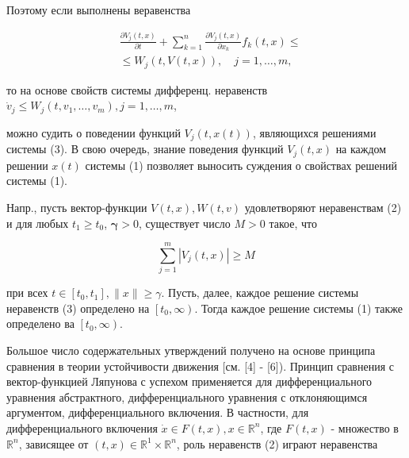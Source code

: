 \documentclass[10pt]{article}
\begin{document}
Поэтому если выполнены веравенства



\[

\begin{aligned}

& \frac{\partial V_{j}(t, x)}{\partial t}+\sum_{k=1}^{n} \frac{\partial V_{j}(t, x)}{\partial x_{k}} f_{k}(t, x) \leqslant \\

& \leqslant W_{j}(t, V(t, x)), \quad j=1, \ldots, m,

\end{aligned}

\]



то на основе свойств системы дифференц. неравенств $\dot{v}_{j} \leqslant W_{j}\left(t, v_{1}, \ldots, v_{m}\right), j=1, \ldots, m$,



можно судить о поведении функций $V_{j}(t, x(t))$, являющихся решениями системы (3). В свою очередь, знание поведения функций $V_{j}(t, x)$ на каждом решении $x(t)$ системы (1) позволяет выносить суждения о свойствах решений системы (1).



Напр., пусть вектор-функции $V(t, x), W(t, v)$ удовлетворяют неравенствам (2) и для любых $t_{1} \geqslant t_{0}$, $\boldsymbol{\gamma}>0$, существует число $M>0$ такое, что



\[

\sum_{j=1}^{m}\left|V_{j}(t, x)\right| \geqslant M

\]



при всех $t \in\left[t_{0}, t_{1}\right],\|x\| \geqslant \gamma$. Пусть, далее, каждое решение системы неравенств (3) определено на $\left[t_{0}, \infty\right)$. Тогда каждое решение системы (1) также определено ва $\left[t_{0}, \infty\right)$.



Большое число содержательных утверждений получено на основе принципа сравнения в теории устойчивости движения [см. [4] - [6]). Принцип сравнения с вектор-функцией Ляпунова с успехом применяется для дифференциального уравнения абстрактного, дифференциального уравнения с отклоняющимся аргументом, дифференциального включения. В частности, для дифференциального включения $\dot{x} \in F(t, x), x \in \mathbb{R}^{n}$, где $F(t, x)$ - множество в $\mathbb{R}^{n}$, зависящее от $(t, x) \in \mathbb{R}^{1} \times \mathbb{R}^{n}$, роль неравенств (2) играют неравенства
\end{document}
